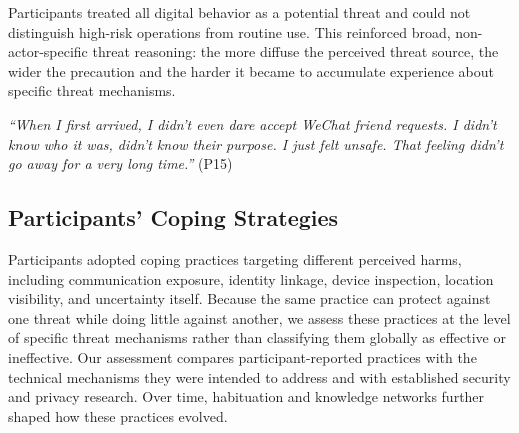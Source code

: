 \documentclass[conference,compsoc]{IEEEtran}
\begin{document}
Participants treated all digital behavior as a potential threat and could not distinguish high-risk operations from routine use. This reinforced broad, non-actor-specific threat reasoning: the more diffuse the perceived threat source, the wider the precaution and the harder it became to accumulate experience about specific threat mechanisms.

\begin{displayquote}
\textit{``When I first arrived, I didn't even dare accept WeChat friend requests. I didn't know who it was, didn't know their purpose. I just felt unsafe. That feeling didn't go away for a very long time.''} (P15)
\end{displayquote}




\subsection{Participants' Coping Strategies}
\label{subsec:coping}

Participants adopted coping practices targeting different perceived harms, including communication exposure, identity linkage, device inspection, location visibility, and uncertainty itself. Because the same practice can protect against one threat while doing little against another, we assess these practices at the level of specific threat mechanisms rather than classifying them globally as effective or ineffective. Our assessment compares participant-reported practices with the technical mechanisms they were intended to address and with established security and privacy research. Over time, habituation and knowledge networks further shaped how these practices evolved.
\end{document}
